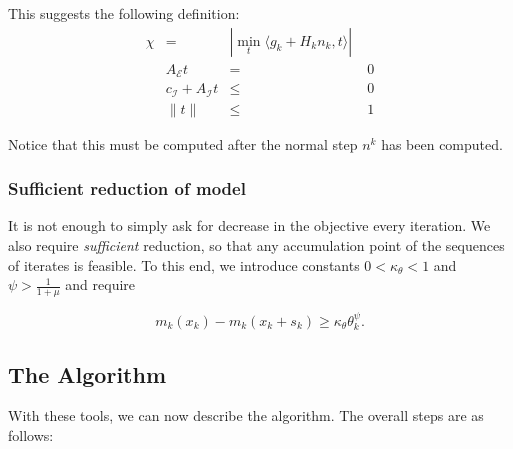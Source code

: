 \documentclass{article}
\begin{document}
This suggests the following definition:
\begin{align}
\label{critical}
\chi & = & |\min_t \langle g_k + H_kn_k, t\rangle| \\
& A_{\mathcal {E}}t &=& \; 0 \\
& c_{\mathcal {I}} + A_{\mathcal {I}}t &\le& \; 0 \\
& \| t \| &\le& \; 1
\end{align}

Notice that this must be computed after the normal step $n^k$ has been computed.


\subsubsection{Sufficient reduction of model}
It is not enough to simply ask for decrease in the objective every iteration.
We also require \emph{sufficient} reduction, so that any accumulation point of the sequences of iterates is feasible.
To this end, we introduce constants $0 < \kappa_{\theta} < 1$ and $\psi > \frac{1}{1+\mu}$ and require

\begin{equation}
\label{predicted_decrease}
m_k(x_k) - m_k(x_k+s_k) \ge \kappa_{\theta} \theta_k^{\psi}.
\end{equation}



\newpage
\subsection{The Algorithm}

With these tools, we can now describe the algorithm.
The overall steps are as follows:
\end{document}
